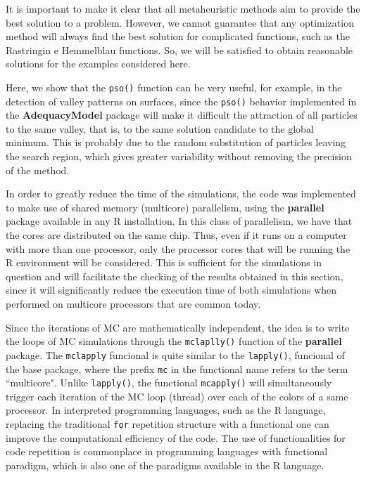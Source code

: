 \documentclass[10pt,letterpaper]{article}
\begin{document}
It is important to make it clear that all metaheuristic methods aim to provide the best solution to a problem. However, we cannot guarantee that any optimization method will always find the best solution for complicated functions, such as the  Rastringin e Hemmelblau functions. So, we will be satisfied to obtain reasonable solutions for the examples considered here.

Here, we show that the \texttt{pso()} function can be very useful, for example, in the detection of valley patterns on surfaces, since the \texttt{pso()} behavior implemented in the \textbf{AdequacyModel} package will make it difficult the attraction of all particles to the same valley, that is, to the same solution candidate to the global minimum. This is probably due to the random substitution of particles leaving the search region, which gives greater variability without removing the precision of the method.
 
In order to greatly reduce the time of the simulations, the code was implemented to make use of shared memory (multicore) parallelism, using the \textbf{parallel} package available in any \textsc{R} installation. In this class of parallelism, we have that the cores are distributed on the same chip. Thus, even if it runs on a computer with more than one processor, only the processor cores that will be running the \textsc{R} environment will be considered. This is sufficient for the simulations in question and will facilitate the checking of the results obtained in this section, since it will significantly reduce the execution time of both simulations when performed on multicore processors that are common today.
  
Since the iterations of MC are mathematically independent, the idea is to write the loops of MC simulations through the \texttt{mclaplly()} function of the \textbf{parallel} package. The \texttt{mclapply} funcional is quite similar to the \texttt{lapply()}, funcional of the base package, where the prefix \texttt{mc} in the functional name refers to the term ``multicore". Unlike \texttt{lapply()}, the functional \texttt{mcapply()} will simultaneously trigger each iteration of the MC loop (thread) over each of the colors of a same processor. In interpreted programming languages, such as the \textsc{R} language, replacing the traditional \texttt{for} repetition structure with a functional one can improve the computational efficiency of the code. The use of functionalities for code repetition is commonplace in programming languages with functional paradigm, which is also one of the paradigms available in the \textsc{R} language.
\end{document}
